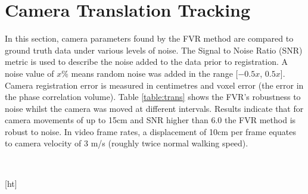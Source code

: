 \section{Camera Translation Tracking}
\label{Sec:CamTransTrackExp}

In this section, camera parameters found by the FVR method are compared to ground truth data under various levels of noise. The Signal to Noise Ratio (SNR) metric is used to describe the noise added to the data prior to registration. A noise value of $x$\% means random noise was added in the range [$-0.5x$, $0.5x$]. Camera registration error is measured in centimetres and voxel error (the error in the phase correlation volume). Table \ref{table:trans} shows the FVR's robustness to noise whilst the camera was moved at different intervals. Results indicate that for camera movements of up to 15cm and SNR higher than 6.0 the FVR method is robust to noise. In video frame rates, a displacement of 10cm per frame equates to camera velocity of 3 m/s (roughly twice normal walking speed).  \\


\begin{table}[ht]
\centering
{}
\\
\caption{Translation Tracking}
\label{table:trans}
\end{table}[ht]

